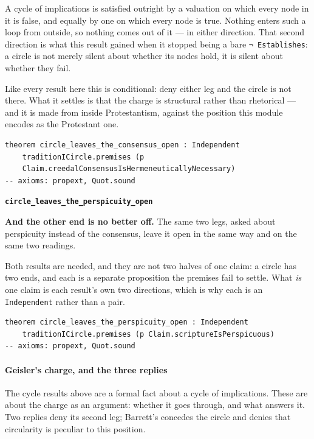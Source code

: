 \documentclass[11pt]{article}
\begin{document}
A cycle of implications is satisfied outright by a valuation on which every node in it is false, and equally by one on which every node is true. Nothing enters such a loop from outside, so nothing comes out of it — in either direction. That second direction is what this result gained when it stopped being a bare \texttt{¬ Establishes}: a circle is not merely silent about whether its nodes hold, it is silent about whether they fail.

Like every result here this is conditional: deny either leg and the circle is not there. What it settles is that the charge is structural rather than rhetorical — and it is made from inside Protestantism, against the position this module encodes as the Protestant one.

{\small\begin{verbatim}
theorem circle_leaves_the_consensus_open : Independent
    traditionICircle.premises (p
    Claim.creedalConsensusIsHermeneuticallyNecessary)
-- axioms: propext, Quot.sound
\end{verbatim}}
\par\medskip\noindent\textbf{\texttt{circle\_\allowbreak{}leaves\_\allowbreak{}the\_\allowbreak{}perspicuity\_\allowbreak{}open}}\par\nobreak\noindent
\textbf{And the other end is no better off.} The same two legs, asked about perspicuity instead of the consensus, leave it open in the same way and on the same two readings.

Both results are needed, and they are not two halves of one claim: a circle has two ends, and each is a separate proposition the premises fail to settle. What \emph{is} one claim is each result's own two directions, which is why each is an \texttt{Independent} rather than a pair.

{\small\begin{verbatim}
theorem circle_leaves_the_perspicuity_open : Independent
    traditionICircle.premises (p Claim.scriptureIsPerspicuous)
-- axioms: propext, Quot.sound
\end{verbatim}}
\paragraph*{Geisler's charge, and the three replies}
\leavevmode\par
The cycle results above are a formal fact about a cycle of implications. These are about the charge as an argument: whether it goes through, and what answers it. Two replies deny its second leg; Barrett's concedes the circle and denies that circularity is peculiar to this position.
\end{document}
